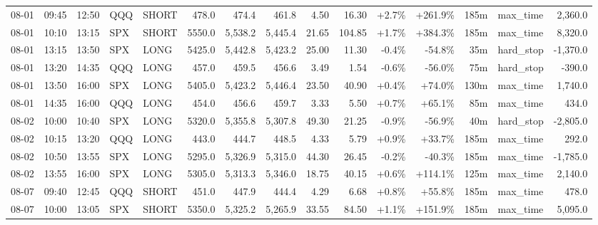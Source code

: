 \documentclass[11pt,a4paper,twoside]{article}
\begin{document}
\begin{landscape}
\begin{center}
\begin{longtable}{>{\color{txtmain}}l l l l l r r r r r r r r >{\color{txtmain}}l r}
08-01 & 09:45 & 12:50 & QQQ & SHORT & 478.0 & 474.4 & 461.8 & 4.50 & 16.30 & \textcolor{wingreen}{+2.7\%} & \textcolor{wingreen}{+261.9\%} & 185m & max\_time & \textcolor{wingreen}{2,360.0} \\
08-01 & 10:10 & 13:15 & SPX & SHORT & 5550.0 & 5,538.2 & 5,445.4 & 21.65 & 104.85 & \textcolor{wingreen}{+1.7\%} & \textcolor{wingreen}{+384.3\%} & 185m & max\_time & \textcolor{wingreen}{8,320.0} \\
08-01 & 13:15 & 13:50 & SPX & LONG & 5425.0 & 5,442.8 & 5,423.2 & 25.00 & 11.30 & \textcolor{lossred}{-0.4\%} & \textcolor{lossred}{-54.8\%} & 35m & hard\_stop & \textcolor{lossred}{-1,370.0} \\
08-01 & 13:20 & 14:35 & QQQ & LONG & 457.0 & 459.5 & 456.6 & 3.49 & 1.54 & \textcolor{lossred}{-0.6\%} & \textcolor{lossred}{-56.0\%} & 75m & hard\_stop & \textcolor{lossred}{-390.0} \\
08-01 & 13:50 & 16:00 & SPX & LONG & 5405.0 & 5,423.2 & 5,446.4 & 23.50 & 40.90 & \textcolor{wingreen}{+0.4\%} & \textcolor{wingreen}{+74.0\%} & 130m & max\_time & \textcolor{wingreen}{1,740.0} \\
08-01 & 14:35 & 16:00 & QQQ & LONG & 454.0 & 456.6 & 459.7 & 3.33 & 5.50 & \textcolor{wingreen}{+0.7\%} & \textcolor{wingreen}{+65.1\%} & 85m & max\_time & \textcolor{wingreen}{434.0} \\
08-02 & 10:00 & 10:40 & SPX & LONG & 5320.0 & 5,355.8 & 5,307.8 & 49.30 & 21.25 & \textcolor{lossred}{-0.9\%} & \textcolor{lossred}{-56.9\%} & 40m & hard\_stop & \textcolor{lossred}{-2,805.0} \\
08-02 & 10:15 & 13:20 & QQQ & LONG & 443.0 & 444.7 & 448.5 & 4.33 & 5.79 & \textcolor{wingreen}{+0.9\%} & \textcolor{wingreen}{+33.7\%} & 185m & max\_time & \textcolor{wingreen}{292.0} \\
08-02 & 10:50 & 13:55 & SPX & LONG & 5295.0 & 5,326.9 & 5,315.0 & 44.30 & 26.45 & \textcolor{lossred}{-0.2\%} & \textcolor{lossred}{-40.3\%} & 185m & max\_time & \textcolor{lossred}{-1,785.0} \\
08-02 & 13:55 & 16:00 & SPX & LONG & 5305.0 & 5,313.3 & 5,346.0 & 18.75 & 40.15 & \textcolor{wingreen}{+0.6\%} & \textcolor{wingreen}{+114.1\%} & 125m & max\_time & \textcolor{wingreen}{2,140.0} \\
08-07 & 09:40 & 12:45 & QQQ & SHORT & 451.0 & 447.9 & 444.4 & 4.29 & 6.68 & \textcolor{wingreen}{+0.8\%} & \textcolor{wingreen}{+55.8\%} & 185m & max\_time & \textcolor{wingreen}{478.0} \\
08-07 & 10:00 & 13:05 & SPX & SHORT & 5350.0 & 5,325.2 & 5,265.9 & 33.55 & 84.50 & \textcolor{wingreen}{+1.1\%} & \textcolor{wingreen}{+151.9\%} & 185m & max\_time & \textcolor{wingreen}{5,095.0} \\

\end{longtable}
\end{center}
\end{landscape}
\end{document}
